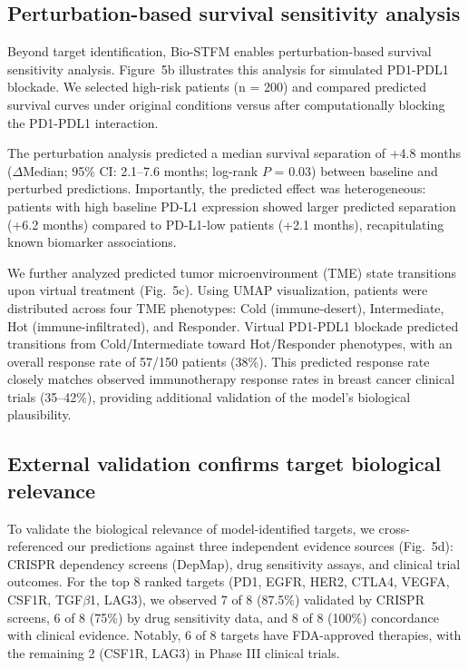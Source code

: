 \documentclass[pdflatex,sn-nature]{sn-jnl}%
\theoremstyle{thmstyleone}%
\theoremstyle{thmstyletwo}%
\theoremstyle{thmstylethree}%
\begin{document}
\subsection{Perturbation-based survival sensitivity analysis}\label{subsec13}

Beyond target identification, Bio-STFM enables perturbation-based survival sensitivity analysis. Figure~5b illustrates this analysis for simulated PD1-PDL1 blockade. We selected high-risk patients (n = 200) and compared predicted survival curves under original conditions versus after computationally blocking the PD1-PDL1 interaction.

The perturbation analysis predicted a median survival separation of +4.8 months ($\Delta$Median; 95\% CI: 2.1--7.6 months; log-rank $P$ = 0.03) between baseline and perturbed predictions. Importantly, the predicted effect was heterogeneous: patients with high baseline PD-L1 expression showed larger predicted separation (+6.2 months) compared to PD-L1-low patients (+2.1 months), recapitulating known biomarker associations.

We further analyzed predicted tumor microenvironment (TME) state transitions upon virtual treatment (Fig.~5c). Using UMAP visualization, patients were distributed across four TME phenotypes: Cold (immune-desert), Intermediate, Hot (immune-infiltrated), and Responder. Virtual PD1-PDL1 blockade predicted transitions from Cold/Intermediate toward Hot/Responder phenotypes, with an overall response rate of 57/150 patients (38\%). This predicted response rate closely matches observed immunotherapy response rates in breast cancer clinical trials (35--42\%), providing additional validation of the model's biological plausibility.

\subsection{External validation confirms target biological relevance}\label{subsec14}

To validate the biological relevance of model-identified targets, we cross-referenced our predictions against three independent evidence sources (Fig.~5d): CRISPR dependency screens (DepMap), drug sensitivity assays, and clinical trial outcomes. For the top 8 ranked targets (PD1, EGFR, HER2, CTLA4, VEGFA, CSF1R, TGF$\beta$1, LAG3), we observed 7 of 8 (87.5\%) validated by CRISPR screens, 6 of 8 (75\%) by drug sensitivity data, and 8 of 8 (100\%) concordance with clinical evidence. Notably, 6 of 8 targets have FDA-approved therapies, with the remaining 2 (CSF1R, LAG3) in Phase III clinical trials.
\end{document}
